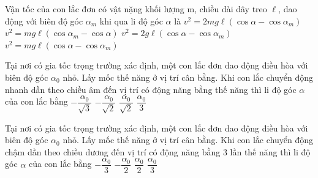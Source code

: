 \begin{ex}%
Vận tốc của con lắc đơn có vật nặng khối lượng m, chiều dài dây treo $\ell$, dao động với biên độ góc $\alpha _m$ khi qua li độ góc $\alpha $ là
\choice
{$v^2=2mg\ell\left({\cos\alpha - \cos\alpha _m}\right)$}
{$v^2=mg\ell\left({\cos\alpha _m-\cos\alpha }\right)$}
{\True $v^2=2g\ell\left({\cos\alpha -\cos\alpha _m}\right)$}
{$v^2=mg\ell\left({\cos\alpha - \cos\alpha _m}\right)$}
\end{ex} 
\begin{ex}%
Tại nơi có gia tốc trọng trường xác định, một con lắc đơn dao động điều hòa với biên độ góc $\alpha_0$ nhỏ. Lấy mốc thế năng ở vị trí cân bằng. Khi con lắc chuyển động nhanh dần theo chiều âm đến vị trí có động năng bằng thế năng thì li độ góc $\alpha$ của con lắc bằng
\choice
{$-\dfrac{\alpha_0}{\sqrt{3}}$}
{$-\dfrac{\alpha_0}{\sqrt{2}}$}
{\True $\dfrac{\alpha_0}{\sqrt{2}}$}
{$\dfrac{\alpha_0}{3}$}
\end{ex} 
\begin{ex}%
Tại nơi có gia tốc trọng trường xác định, một con lắc đơn dao động điều hòa với biên độ góc $\alpha_0$ nhỏ. Lấy mốc thế năng ở vị trí cân bằng. Khi con lắc chuyển động chậm dần theo chiều dương đến vị trí có động năng bằng 3 lần thế năng thì li độ góc $\alpha$ của con lắc bằng
\choice
{$-\dfrac{\alpha_0}{3}$}
{$-\dfrac{\alpha_0}{2}$}
{\True $\dfrac{\alpha_0}{2}$}
{$\dfrac{\alpha_0}{3}$}
\end{ex} 
